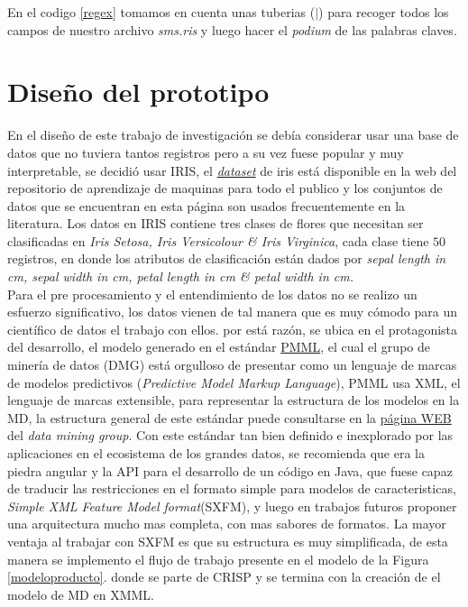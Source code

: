    En el codigo \ref{regex} tomamos en cuenta unas tuberias ($\mid$) para recoger todos los campos de nuestro archivo \textit{sms.ris} y luego hacer el \textit{podium} de las palabras claves.
  
  \section{Diseño del prototipo}
  En el diseño de este trabajo de investigación se debía considerar usar una base de datos que no tuviera tantos registros pero a su vez fuese popular y muy interpretable, se decidió usar IRIS,  el \href{https://archive.ics.uci.edu/ml/datasets/iris}{\textit{dataset}} de iris está disponible en la web del repositorio de aprendizaje de maquinas para todo el publico y los conjuntos de datos que se encuentran en esta página son usados frecuentemente en la literatura\cite{Hastie2009,Izenman2006, Farid2014, Maldonado2015, Qian2015}.
  Los datos en IRIS contiene tres clases de flores que necesitan ser clasificadas en \textit{Iris Setosa, Iris Versicolour \& Iris Virginica}, cada clase tiene $50$ registros,  en donde los atributos de clasificación están dados por \textit{sepal length in cm, sepal width in cm, petal length in cm \& petal width in cm.}\\
  Para el pre procesamiento y el entendimiento de los datos no se realizo un esfuerzo significativo, los datos vienen de tal manera que es muy cómodo para un científico de datos el trabajo con ellos. por está razón, se ubica en el protagonista del desarrollo, el modelo generado en el estándar \href{http://dmg.org/pmml/pmml_examples/index.html}{PMML}, el cual el grupo de minería de datos (DMG) está orgulloso de presentar como un lenguaje de marcas de modelos predictivos (\textit{Predictive Model Markup Language}), PMML usa XML, el lenguaje de marcas extensible, para representar la estructura de los modelos en la MD, la estructura general de este estándar puede consultarse en la \href{http://dmg.org/pmml/v4-3/GeneralStructure.html}{página WEB} del \textit{data mining group}.
  Con este estándar tan bien definido e inexplorado por las aplicaciones en el ecosistema de los grandes datos, se recomienda que era la piedra angular y la API para el desarrollo de un código en Java, que fuese capaz de traducir las restricciones en el formato simple para modelos de caracteristicas,  \textit{Simple XML Feature Model format}(SXFM)\cite{Mendonca:2009:SSP:1639950.1640002}, y luego en trabajos futuros proponer una arquitectura mucho mas completa, con mas sabores de formatos. La mayor ventaja al trabajar con SXFM es que su estructura es muy simplificada, de esta manera se implemento el flujo de trabajo presente en el modelo de la Figura \ref{modeloproducto}.  donde se parte de CRISP\cite{Hornick2009, Isaza2014, Harding2006} y se termina con la creación de el modelo de MD en XMML.
  
